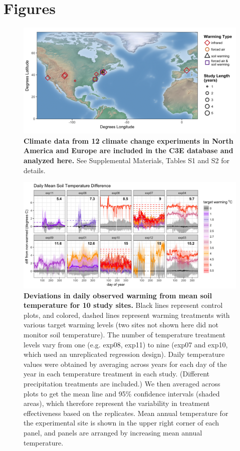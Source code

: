 \documentclass{article}
\begin{document}
\section* {Figures}
\begin{figure}[p]
\centering
\includegraphics{../Analyses/maps/RadcliffeLocations_Experiments_Open.png} 
\caption{\textbf{Climate data from 12 climate change experiments in North America and Europe are included in the C3E database and analyzed here.} See Supplemental Materials, Tables S1 and S2 for details.} 
 \label{fig:map}
 \end{figure}
\clearpage
\begin{figure}[h]
\centering
 \includegraphics{../Analyses/figures/Exploratory_TimeSeries_SoilTemp1Mean_Deviation.png}
 \caption{\textbf{Deviations in daily observed warming from mean soil temperature for 10 study sites.} Black lines represent control plots, and colored, dashed lines represent warming treatments with various target warming levels (two sites not shown here did not monitor soil temperature). The number of temperature treatment levels vary from one (e.g. exp08, exp11) to nine (exp07 and exp10, which used an unreplicated regression design). Daily temperature values were obtained by averaging across years for each day of the year in each temperature treatment in each study. (Different precipitation treatments are included.) We then averaged across plots to get the mean line and 95\% confidence intervals (shaded areas), which therefore represent the variability in treatment effectiveness based on the replicates. Mean annual temperature for the experimental site is shown in the upper right corner of each panel, and panels are arranged by increasing mean annual temperature.}
 \label{fig:effwarm}

 \end{figure}
\end{document}
